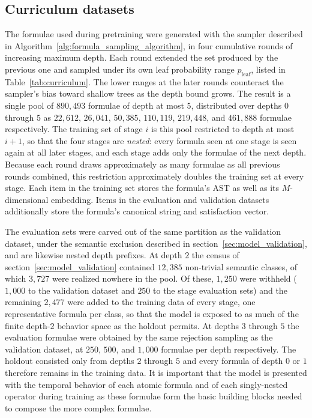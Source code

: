 \documentclass[titlepage,a4paper,11pt]{report}
\begin{document}
    
    \subsection{Curriculum datasets}\label{sec:curriculum_data}
    The formulae used during pretraining were generated with the sampler described in Algorithm~\ref{alg:formula_sampling_algorithm}, in four cumulative rounds of increasing maximum depth. Each round extended the set produced by the previous one and sampled under its own leaf probability range $p_{\text{leaf}}$, listed in Table~\ref{tab:curriculum}. The lower ranges at the later rounds counteract the sampler's bias toward shallow trees as the depth bound grows. The result is a single pool of $890{,}493$ formulae of depth at most $5$, distributed over depths $0$ through $5$ as $22{,}612$, $26{,}041$, $50{,}385$, $110{,}119$, $219{,}448$, and $461{,}888$ formulae respectively. The training set of stage $i$ is this pool restricted to depth at most $i+1$, so that the four stages are \emph{nested}: every formula seen at one stage is seen again at all later stages, and each stage adds only the formulae of the next depth. Because each round draws approximately as many formulae as all previous rounds combined, this restriction approximately doubles the training set at every stage. Each item in the training set stores the formula's AST as well as its $M$-dimensional embedding. Items in the evaluation and validation datasets additionally store the formula's canonical string and satisfaction vector.
    
    The evaluation sets were carved out of the same partition as the validation dataset, under the semantic exclusion described in section~\ref{sec:model_validation}, and are likewise nested depth prefixes. At depth $2$ the census of section~\ref{sec:model_validation} contained $12{,}385$ non-trivial semantic classes, of which $3{,}727$ were realized nowhere in the pool. Of these, $1{,}250$ were withheld ($1{,}000$ to the validation dataset and $250$ to the stage evaluation sets) and the remaining $2{,}477$ were added to the training data of every stage, one representative formula per class, so that the model is exposed to as much of the finite depth-$2$ behavior space as the holdout permits. At depths $3$ through $5$ the evaluation formulae were obtained by the same rejection sampling as the validation dataset, at $250$, $500$, and $1{,}000$ formulae per depth respectively. The holdout consisted only from depths $2$ through $5$ and every formula of depth $0$ or $1$ therefore remains in the training data. It is important that the model is presented with the temporal behavior of each atomic formula and of each singly-nested operator during training as these formulae form the basic building blocks needed to compose the more complex formulae.
    
\end{document}
